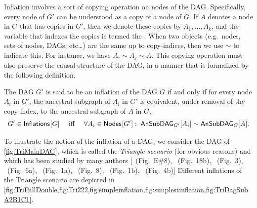 Inflation involves a sort of copying operation on nodes of the DAG.  Specifically, every node of $G'$ can be understood as a copy of a node of $G$.    If $A$ denotes a node in $G$ that has copies in $G'$, then we denote these copies by $A_1,\ldots, A_k$, and the variable that indexes the copies is termed the .  When two objects (e.g.~nodes, sets of nodes, DAGs, etc\ldots) are the same up to copy-indices, then we use $\sim$ to indicate this.  For instance, we have $A_i\sim A_j\sim A$.   This copying operation must also preserve the causal structure of the DAG, in a manner that is formalized by the following definition. 
\begin{definition}
The DAG $G'$ is said to be an inflation of the DAG $G$ if and only if  for every node $A_i$ in $G'$, the ancestral subgraph of $A_i$ in $G'$ is equivalent, under removal of the copy index, to the ancestral subgraph of $A$ in $G$,
\begin{align}\label{eq:definflationDAG}
G' \in\SmallNamedFunction{Inflations}{G} \quad\text{ iff }\quad \forall A_i\in \SmallNamedFunction{Nodes}{G'}:\; \ansubgraph[G']{A_i}\sim\ansubgraph[G]{A}.
\end{align}
\end{definition}

To illustrate the notion of the inflation of a DAG, we consider the DAG of \cref{fig:TriMainDAG}, which is called the {\em Triangle scenario} (for obvious reasons) and which has been studied by many authors [\citealp{pusey2014gdag}~(Fig.~E\#8), \citealp{WoodSpekkens}~(Fig.~18b), \citealp{fritz2012bell}~(Fig.~3), \citealp{chaves2014novel}~(Fig.~6a), \citealp{Chaves2015infoquantum}~(Fig.~1a), \citealp{BilocalCorrelations}~(Fig.~8), \citealp{steudel2010ancestors}~(Fig.~1b), \citealp{chaves2014informationinference}~(Fig.~4b)]
Different inflations of the Triangle scenario are depicted in \cref{fig:TriFullDouble,fig:Tri222,fig:simpleinflation,fig:simplestinflation,fig:TriDagSubA2B1C1}.

